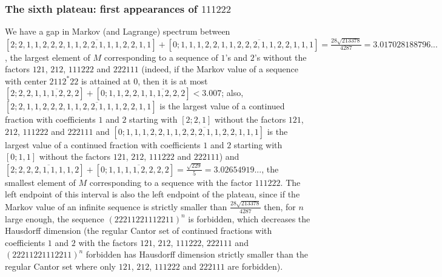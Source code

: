 \documentclass[10pt]{amsart}
\numberwithin{equation}{section}
\theoremstyle{definition}
\begin{document}
\subsubsection{The sixth plateau: first appearances of $111222$} We have a gap in Markov (and Lagrange) spectrum between $[2;2,1,1,\overline{2,2,2,1,1,2,2,1,1,1,2,2,1,1}]+[0;1,1,1,\overline{2,2,1,1,2,2,2,1,1,2,2,1,1,1}]=\frac{28\sqrt{213378}}{4287}=3.017028188796...$, the largest element of $M$ corresponding to a sequence of $1$'s and $2$'s without the factors $121$, $212$, $111222$ and $222111$ (indeed, if the Markov value of a sequence with center $2112^*22$ is attained at $0$, then it is at most $[2;2,2,\overline{1,1,1,2,2,2}]+[0;1,1,2,2,\overline{1,1,1,2,2,2}]<3.007$; also, $[2;2,1,1,\overline{2,2,2,1,1,2,2,1,1,1,2,2,1,1}]$ is the largest value of a continued fraction with coefficients $1$ and $2$ starting with $[2;2,1]$ without the factors $121$, $212$, $111222$ and $222111$ and $[0;1,1,1,\overline{2,2,1,1,2,2,2,1,1,2,2,1,1,1}]$ is the largest value of a continued fraction with coefficients $1$ and $2$ starting with $[0;1,1]$ without the factors $121$, $212$, $111222$ and $222111$) and $[2; \overline{2,2,2,1,1,1,1,2}]+[0;\overline{1,1,1,1,2,2,2,2}]=\frac{\sqrt{229}}5=3.02654919...$, the smallest element of $M$ corresponding to a sequence with the factor $111222$. The left endpoint of this interval is also the left endpoint of the plateau, since if the Markov value of an infinite sequence is strictly smaller than $\frac{28\sqrt{213378}}{4287}$ then, for $n$ large enough, the sequence $(22211221112211)^n$ is forbidden, which decreases the Hausdorff dimension (the regular Cantor set of continued fractions with coefficients $1$ and $2$ with the factors $121$, $212$, $111222$, $222111$ and $(22211221112211)^n$ forbidden has Hausdorff dimension strictly smaller than the regular Cantor set where only $121$, $212$, $111222$ and $222111$ are forbidden). 
\end{document}
